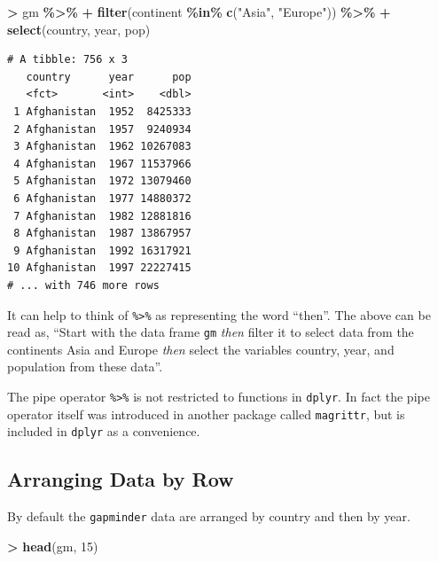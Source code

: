 \documentclass[
]{krantz}
\makeatletter
\newenvironment{Shaded}{\begin{snugshade}}{\end{snugshade}}
\newcommand{\DecValTok}[1]{\textcolor[rgb]{0.06,0.06,0.06}{#1}}
\newcommand{\KeywordTok}[1]{\textcolor[rgb]{0.27,0.27,0.27}{\textbf{#1}}}
\newcommand{\NormalTok}[1]{#1}
\newcommand{\OperatorTok}[1]{\textcolor[rgb]{0.43,0.43,0.43}{\textbf{#1}}}
\newcommand{\StringTok}[1]{\textcolor[rgb]{0.5,0.5,0.5}{#1}}
\newenvironment{kframe}{%
\medskip{}
\setlength{\fboxsep}{.8em}
 \def\at@end@of@kframe{}%
 \ifinner\ifhmode%
  \def\at@end@of@kframe{\end{minipage}}%
  \begin{minipage}{\columnwidth}%
 \fi\fi%
 \def\FrameCommand##1{\hskip\@totalleftmargin \hskip-\fboxsep
 \colorbox{shadecolor}{##1}\hskip-\fboxsep
     \hskip-\linewidth \hskip-\@totalleftmargin \hskip\columnwidth}%
 \MakeFramed {\advance\hsize-\width
   \@totalleftmargin\z@ \linewidth\hsize
   \@setminipage}}%
 {\par\unskip\endMakeFramed%
 \at@end@of@kframe}
\renewenvironment{Shaded}{\begin{kframe}}{\end{kframe}}
\makeatother
\begin{document}
\begin{Shaded}
\begin{Highlighting}[]
\OperatorTok{\textgreater{}}\StringTok{ }\NormalTok{gm }\OperatorTok{\%\textgreater{}\%}\StringTok{ }
\OperatorTok{+}\StringTok{   }\KeywordTok{filter}\NormalTok{(continent }\OperatorTok{\%in\%}\StringTok{ }\KeywordTok{c}\NormalTok{(}\StringTok{"Asia"}\NormalTok{, }\StringTok{"Europe"}\NormalTok{)) }\OperatorTok{\%\textgreater{}\%}\StringTok{ }
\OperatorTok{+}\StringTok{   }\KeywordTok{select}\NormalTok{(country, year, pop)}
\end{Highlighting}
\end{Shaded}

\begin{verbatim}
# A tibble: 756 x 3
   country      year      pop
   <fct>       <int>    <dbl>
 1 Afghanistan  1952  8425333
 2 Afghanistan  1957  9240934
 3 Afghanistan  1962 10267083
 4 Afghanistan  1967 11537966
 5 Afghanistan  1972 13079460
 6 Afghanistan  1977 14880372
 7 Afghanistan  1982 12881816
 8 Afghanistan  1987 13867957
 9 Afghanistan  1992 16317921
10 Afghanistan  1997 22227415
# ... with 746 more rows
\end{verbatim}

It can help to think of \texttt{\%\textgreater{}\%} as representing the word ``then''. The above can be read as, ``Start with the data frame \texttt{gm} \emph{then} filter it to select data from the continents Asia and Europe \emph{then} select the variables country, year, and population from these data''.

The pipe operator \texttt{\%\textgreater{}\%} is not restricted to functions in \texttt{dplyr}. In fact the pipe operator itself was introduced in another package called \texttt{magrittr}, but is included in \texttt{dplyr} as a convenience.

\hypertarget{arranging-data-by-row}{%
\subsection{Arranging Data by Row}\label{arranging-data-by-row}}

By default the \texttt{gapminder} data are arranged by country and then by year.

\begin{Shaded}
\begin{Highlighting}[]
\OperatorTok{\textgreater{}}\StringTok{ }\KeywordTok{head}\NormalTok{(gm, }\DecValTok{15}\NormalTok{)}
\end{Highlighting}
\end{Shaded}
\end{document}
